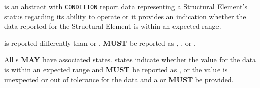  is an abstract  with \texttt{CONDITION}  report data representing a \gls{Structural Element}’s status regarding its ability to operate or it provides an indication whether the data reported for the \gls{Structural Element} is within an expected range.

 is reported differently than  or .   \textbf{MUST} be reported as , , or .

All s \textbf{MAY} have associated  states.   states indicate whether the value for the data is within an expected range and \textbf{MUST} be reported as , or the value is unexpected or out of tolerance for the data and a  or  \textbf{MUST} be provided.


